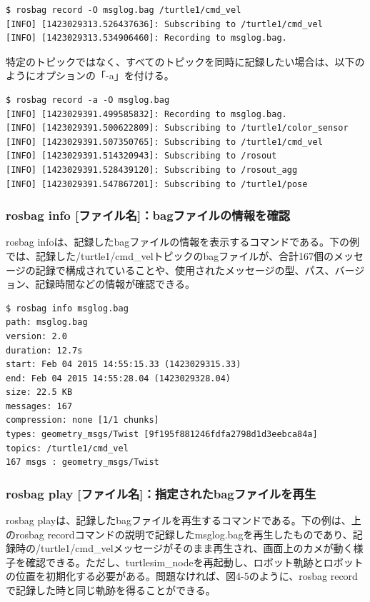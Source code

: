 \begin{lstlisting}[language=ROS]
$ rosbag record -O msglog.bag /turtle1/cmd_vel
[INFO] [1423029313.526437636]: Subscribing to /turtle1/cmd_vel
[INFO] [1423029313.534906460]: Recording to msglog.bag.
\end{lstlisting}

特定のトピックではなく、すべてのトピックを同時に記録したい場合は、以下のようにオプションの「-a」を付ける。

\begin{lstlisting}[language=ROS]
$ rosbag record -a -O msglog.bag
[INFO] [1423029391.499585832]: Recording to msglog.bag.
[INFO] [1423029391.500622809]: Subscribing to /turtle1/color_sensor
[INFO] [1423029391.507350765]: Subscribing to /turtle1/cmd_vel
[INFO] [1423029391.514320943]: Subscribing to /rosout
[INFO] [1423029391.528439120]: Subscribing to /rosout_agg
[INFO] [1423029391.547867201]: Subscribing to /turtle1/pose
\end{lstlisting}

\subsubsection{rosbag info [ファイル名]：bagファイルの情報を確認}

rosbag infoは、記録したbagファイルの情報を表示するコマンドである。下の例では、記録した/turtle1/cmd\_velトピックのbagファイルが、合計167個のメッセージの記録で構成されていることや、使用されたメッセージの型、パス、バージョン、記録時間などの情報が確認できる。

\begin{lstlisting}[language=ROS]
$ rosbag info msglog.bag
path: msglog.bag
version: 2.0
duration: 12.7s
start: Feb 04 2015 14:55:15.33 (1423029315.33)
end: Feb 04 2015 14:55:28.04 (1423029328.04)
size: 22.5 KB
messages: 167
compression: none [1/1 chunks]
types: geometry_msgs/Twist [9f195f881246fdfa2798d1d3eebca84a]
topics: /turtle1/cmd_vel
167 msgs : geometry_msgs/Twist
\end{lstlisting}

\subsubsection{rosbag play [ファイル名]：指定されたbagファイルを再生}

rosbag playは、記録したbagファイルを再生するコマンドである。下の例は、上のrosbag recordコマンドの説明で記録したmsglog.bagを再生したものであり、記録時の/turtle1/cmd\_velメッセージがそのまま再生され、画面上のカメが動く様子を確認できる。ただし、turtlesim\_nodeを再起動し、ロボット軌跡とロボットの位置を初期化する必要がある。問題なければ、図4-5のように、rosbag recordで記録した時と同じ軌跡を得ることができる。

